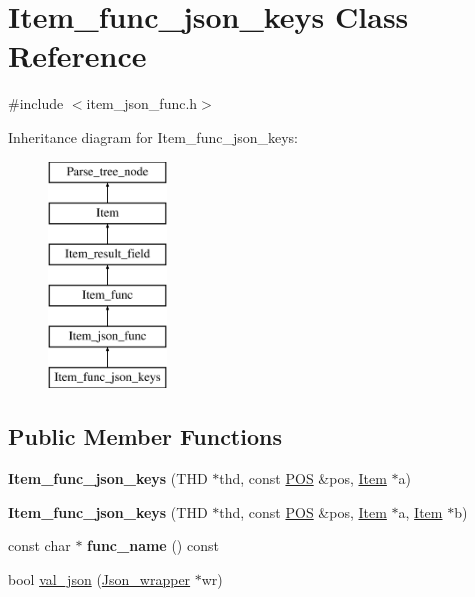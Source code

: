\hypertarget{classItem__func__json__keys}{}\section{Item\+\_\+func\+\_\+json\+\_\+keys Class Reference}
\label{classItem__func__json__keys}


{\ttfamily \#include $<$item\+\_\+json\+\_\+func.\+h$>$}

Inheritance diagram for Item\+\_\+func\+\_\+json\+\_\+keys\+:\begin{figure}[H]
\begin{center}
\leavevmode
\includegraphics[height=6.000000cm]{classItem__func__json__keys}
\end{center}
\end{figure}
\subsection*{Public Member Functions}
\begin{DoxyCompactItemize}
\item 
\mbox{\label{classItem__func__json__keys_a5a862051117232e8b8a8a427c9c345b4}} 
{\bfseries Item\+\_\+func\+\_\+json\+\_\+keys} (T\+HD $\ast$thd, const \mbox{\hyperlink{structYYLTYPE}{P\+OS}} \&pos, \mbox{\hyperlink{classItem}{Item}} $\ast$a)
\item 
\mbox{\label{classItem__func__json__keys_a483eaaaf4cdf46fc237bd2fe20fd3221}} 
{\bfseries Item\+\_\+func\+\_\+json\+\_\+keys} (T\+HD $\ast$thd, const \mbox{\hyperlink{structYYLTYPE}{P\+OS}} \&pos, \mbox{\hyperlink{classItem}{Item}} $\ast$a, \mbox{\hyperlink{classItem}{Item}} $\ast$b)
\item 
\mbox{\label{classItem__func__json__keys_a6bd0ae302adb68fa0f71939be59828db}} 
const char $\ast$ {\bfseries func\+\_\+name} () const
\item 
bool \mbox{\hyperlink{classItem__func__json__keys_aef4e835bbd9ef49b650477f220373ee4}{val\+\_\+json}} (\mbox{\hyperlink{classJson__wrapper}{Json\+\_\+wrapper}} $\ast$wr)
\end{DoxyCompactItemize}
